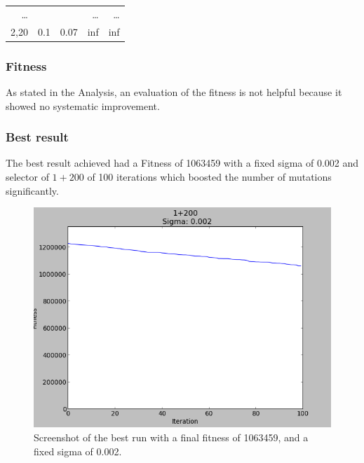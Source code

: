\documentclass{scrartcl}
\begin{document}
\begin{table}[H]
\begin{tabular}{r r r|r r }
\dots & & & \dots & \dots \\
2,20 & 0.1 & 0.07 & inf & inf \\ 
\end{tabular}
\label{tab:vehicle}
\end{table}


\subsubsection{Fitness}
As stated in the Analysis, an evaluation of the fitness is not helpful because it showed no systematic improvement.

\subsubsection{Best result}
The best result achieved had a Fitness of 1063459 with a fixed sigma of 0.002 and selector of $1+200$ of 100 iterations which boosted the number of mutations significantly.

\begin{figure}
 \center
 \includegraphics[width=.5\linewidth]{img/ex4/1063459-1+200-0,002.png}
 \caption{Screenshot of the best run with a final fitness of 1063459, and a fixed sigma of 0.002.}
\end{figure}
\end{document}
